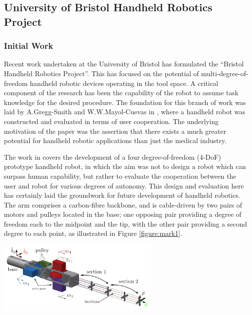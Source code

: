 \documentclass[11pt]{article}
\begin{document}
\subsection{University of Bristol Handheld Robotics Project} \label{bristolhandheld}
\subsubsection{Initial Work}
Recent work undertaken at the University of Bristol has formulated the “Bristol Handheld Robotics Project”. This has focused on the potential of multi-degree-of-freedom handheld robotic devices operating in the tool space. A critical component of the research has been the capability of the robot to assume task knowledge for the desired procedure. The foundation for this branch of work was laid by A.Gregg-Smith and W.W.Mayol-Cuevas in \cite{GreggSmithDesign}, where a handheld robot was constructed and evaluated in terms of user cooperation. The underlying motivation of the paper was the assertion that there exists a much greater potential for handheld robotic applications than just the medical industry.

The work in \cite{GreggSmithDesign} covers the development of a four degree-of-freedom (4-DoF) prototype handheld robot, in which the aim was not to design a robot which can surpass human capability, but rather to evaluate the cooperation between the user and robot for various degrees of autonomy. This design and evaluation here has certainly laid the groundwork for future development of handheld robotics. The arm comprises a carbon-fibre backbone, and is cable-driven by two pairs of motors and pulleys located in the base; one opposing pair providing a degree of freedom each to the midpoint and the tip, with the other pair providing a second degree to each point, as illustrated in Figure \ref{figure:mark1}.


\begin{center}
\includegraphics[width = 0.6\textwidth]{images/mark1.png}
\label{figure:mark1}
\end{center}
\end{document}
